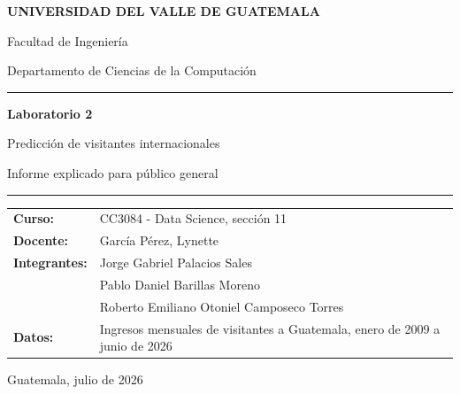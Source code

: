 \documentclass[10pt,letterpaper]{article}
\begin{document}
\begin{titlepage}
\pagecolor{Navy}
\color{white}
\vspace*{0.8cm}

{\Large\bfseries UNIVERSIDAD DEL VALLE DE GUATEMALA\par}
\vspace{0.25cm}
{\large Facultad de Ingeniería\par}
{\large Departamento de Ciencias de la Computación\par}

\vfill

{\color{Teal}\rule{\textwidth}{3pt}}\par
\vspace{0.55cm}
{\Huge\bfseries Laboratorio 2\par}
\vspace{0.2cm}
{\LARGE Predicción de visitantes internacionales\par}
\vspace{0.45cm}
{\Large Informe explicado para público general\par}
\vspace{0.55cm}
{\color{Teal}\rule{\textwidth}{3pt}}\par

\vfill

\begin{tabular}{@{}>{\bfseries}p{3.7cm}p{11cm}@{}}
Curso: & CC3084 - Data Science, sección 11\\[4pt]
Docente: & García Pérez, Lynette\\[4pt]
Integrantes: &
Jorge Gabriel Palacios Sales\\
& Pablo Daniel Barillas Moreno\\
& Roberto Emiliano Otoniel Camposeco Torres\\[4pt]
Datos: & Ingresos mensuales de visitantes a Guatemala,
enero de 2009 a junio de 2026\\
\end{tabular}

\vfill

{\large Guatemala, julio de 2026\par}
\end{titlepage}
\nopagecolor
\color{Ink}
\setcounter{page}{2}

\end{document}
